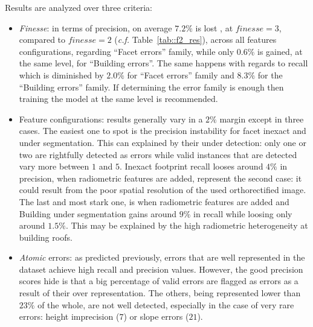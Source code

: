 \documentclass[runningheads]{llncs}
\begin{document}
Results are analyzed over three criteria:
\begin{itemize}
	\item \textit{Finesse}: in terms of precision, on average $7.2\%$ is lost , at $\textit{finesse} = 3$, compared to $\textit{finesse} = 2$ (\textit{c.f.} Table~\ref{tab::f2_res}), across all features configurations, regarding ``Facet errors'' family, while only $0.6\%$ is gained, at the same level, for ``Building errors''. The same happens with regards to recall which is diminished by $2.0\%$ for ``Facet errors'' family and $8.3\%$ for the ``Building errors'' family. If determining the error family is enough then training the model at the same level is recommended.
    \item Feature configurations: results generally vary in a $2\%$ margin except in three cases. The easiest one to spot is the precision instability for facet inexact and under segmentation. This can explained by their under detection: only one or two are rightfully detected as errors while valid instances that are detected vary more between $1$ and $5$. Inexact footprint recall looses around $4\%$ in precision, when radiometric features are added, represent the second case: it could result from the poor spatial resolution of the used orthorectified image. The last and most stark one, is when radiometric features are added and Building under segmentation gains around $9\%$ in recall while loosing only around $1.5\%$. This may be explained by the high radiometric heterogeneity at building roofs.
    \item \textit{Atomic} errors: as predicted previously, errors that are well represented in the dataset achieve high recall and precision values. However, the good precision scores hide is that a big percentage of valid errors are flagged as errors as a result of their over representation. The others, being represented lower than $23\%$ of the whole, are not well detected, especially in the case of very rare errors: height imprecision ($7$) or slope errors ($21$). 
\end{itemize}
\end{document}
